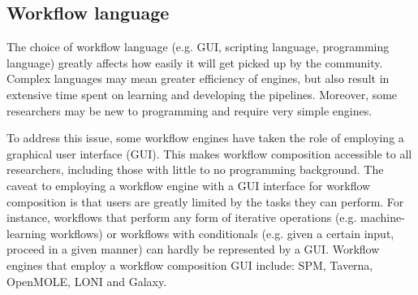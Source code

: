         \subsection{Workflow language}\label{lang} The choice of workflow
            language (e.g. GUI, scripting language, programming language)
            greatly affects how easily it will get picked up by the community.
            Complex languages may mean greater efficiency of engines, but also
            result in extensive time spent on learning and developing the
            pipelines. Moreover, some researchers may be new to
            programming and require very simple engines.

            To address this issue, some workflow engines have taken the role of
            employing a graphical user interface (GUI). This makes workflow
            composition accessible to all researchers, including those with
            little to no programming background. The caveat to employing a
            workflow engine with a GUI interface for workflow composition is
            that users are greatly limited by the tasks they can perform. For
            instance, workflows that perform any form of iterative operations
            (e.g. machine-learning workflows) or workflows with conditionals
            (e.g. given a certain input, proceed in a given manner) can
            hardly be represented by a GUI. Workflow engines that employ a
            workflow composition GUI include: SPM, Taverna, OpenMOLE, LONI and
            Galaxy.

